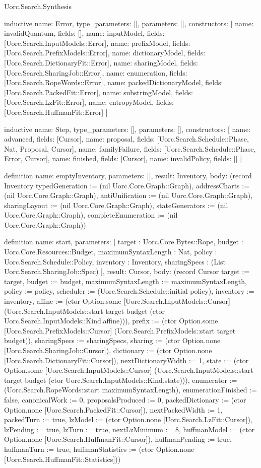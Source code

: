 \begin{lexlean}{Uorc.Search.Synthesis}
\begin{semanticmodule}
inductive{
  name: Error,
  type_parameters: [],
  parameters: [],
  constructors: [
    {name: invalidQuantum, fields: []},
    {name: inputModel, fields: [Uorc.Search.InputModels::Error]},
    {name: prefixModel, fields: [Uorc.Search.PrefixModels::Error]},
    {name: dictionaryModel, fields: [Uorc.Search.DictionaryFit::Error]},
    {name: sharingModel, fields: [Uorc.Search.SharingJob::Error]},
    {name: enumeration, fields: [Uorc.Search.RopeWords::Error]},
    {name: packedDictionaryModel, fields: [Uorc.Search.PackedFit::Error]},
    {name: substringModel, fields: [Uorc.Search.LzFit::Error]},
    {name: entropyModel, fields: [Uorc.Search.HuffmanFit::Error]}
  ]
}

inductive{
  name: Step,
  type_parameters: [],
  parameters: [],
  constructors: [
    {name: advanced, fields: [Cursor]},
    {name: proposal, fields: [Uorc.Search.Schedule::Phase, Nat, Proposal, Cursor]},
    {name: familyFailure, fields: [Uorc.Search.Schedule::Phase, Error, Cursor]},
    {name: finished, fields: [Cursor]},
    {name: invalidPolicy, fields: []}
  ]
}

definition{
  name: emptyInventory,
  parameters: [],
  result: Inventory,
  body: (record Inventory {typedGeneration := (nil Uorc.Core.Graph::Graph), addressCharts := (nil Uorc.Core.Graph::Graph), antiUnification := (nil Uorc.Core.Graph::Graph), sharingLayout := (nil Uorc.Core.Graph::Graph), stateGenerators := (nil Uorc.Core.Graph::Graph), completeEnumeration := (nil Uorc.Core.Graph::Graph)})
}

definition{
  name: start,
  parameters: [
    target : Uorc.Core.Bytes::Rope,
    budget : Uorc.Core.Resources::Budget,
    maximumSyntaxLength : Nat,
    policy : Uorc.Search.Schedule::Policy,
    inventory : Inventory,
    sharingSpecs : (List Uorc.Search.SharingJob::Spec)
  ],
  result: Cursor,
  body: (record Cursor {target := target, budget := budget, maximumSyntaxLength := maximumSyntaxLength, policy := policy, scheduler := (Uorc.Search.Schedule::initial policy), inventory := inventory, affine := (ctor Option.some [Uorc.Search.InputModels::Cursor] (Uorc.Search.InputModels::start target budget (ctor Uorc.Search.InputModels::Kind.affine))), prefix := (ctor Option.some [Uorc.Search.PrefixModels::Cursor] (Uorc.Search.PrefixModels::start target budget)), sharingSpecs := sharingSpecs, sharing := (ctor Option.none [Uorc.Search.SharingJob::Cursor]), dictionary := (ctor Option.none [Uorc.Search.DictionaryFit::Cursor]), nextDictionaryWidth := 1, state := (ctor Option.some [Uorc.Search.InputModels::Cursor] (Uorc.Search.InputModels::start target budget (ctor Uorc.Search.InputModels::Kind.state))), enumerator := (Uorc.Search.RopeWords::start maximumSyntaxLength), enumerationFinished := false, canonicalWork := 0, proposalsProduced := 0, packedDictionary := (ctor Option.none [Uorc.Search.PackedFit::Cursor]), nextPackedWidth := 1, packedTurn := true, lzModel := (ctor Option.none [Uorc.Search.LzFit::Cursor]), lzPending := true, lzTurn := true, nextLzMinimum := 8, huffmanModel := (ctor Option.none [Uorc.Search.HuffmanFit::Cursor]), huffmanPending := true, huffmanTurn := true, huffmanStatistics := (ctor Option.none [Uorc.Search.HuffmanFit::Statistics])})
}


\end{semanticmodule}
\end{lexlean}
